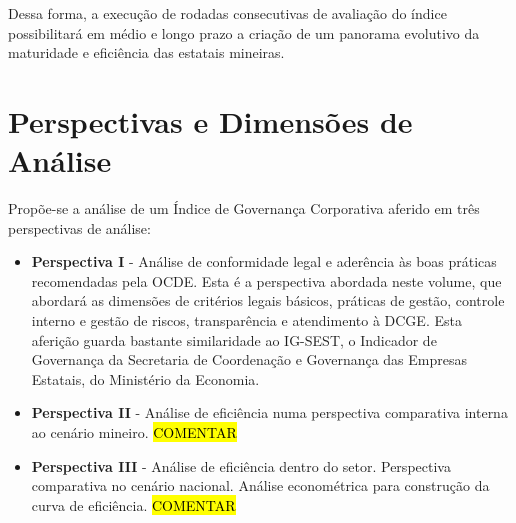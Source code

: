 Dessa forma, a execução de rodadas consecutivas de avaliação do índice possibilitará em médio e longo prazo a criação de um panorama evolutivo da maturidade e eficiência das estatais mineiras.
	
	
	
\section{Perspectivas e Dimensões de Análise}
	
Propõe-se a análise de um Índice de Governança Corporativa  aferido em três perspectivas de análise:
	
\begin{itemize}
	\item \textbf{Perspectiva I} - Análise de conformidade legal e aderência às boas práticas recomendadas pela OCDE. Esta é a perspectiva abordada neste volume, que abordará as dimensões de critérios legais básicos, práticas de gestão, controle interno e gestão de riscos, transparência e atendimento à DCGE. Esta aferição guarda bastante similaridade ao IG-SEST, o Indicador de Governança  da Secretaria de Coordenação e Governança das Empresas Estatais, do Ministério da Economia.
		
	\item \textbf{Perspectiva II} - Análise de eficiência numa perspectiva comparativa interna ao cenário mineiro. \hl{COMENTAR}
		
	\item \textbf{Perspectiva III} - Análise de eficiência dentro do setor. Perspectiva comparativa no cenário nacional. Análise econométrica para construção da curva de eficiência. \hl{COMENTAR}
	\end{itemize}


